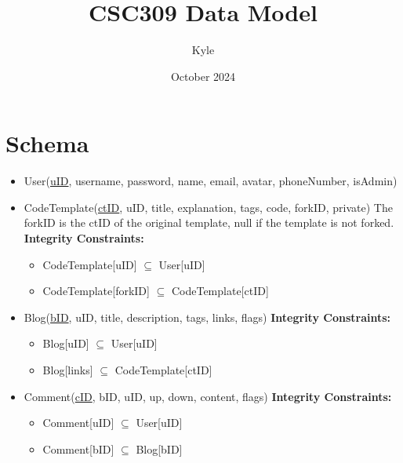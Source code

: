 \documentclass{article}
\title{CSC309 Data Model}
\author{Kyle}
\date{October 2024}
\begin{document}
\maketitle

\section*{Schema}

\begin{itemize}
\item
User(\underline{uID}, username, password, name, email, avatar, phoneNumber, isAdmin)

\item 
CodeTemplate(\underline{ctID}, uID, title, explanation, tags, code, forkID, private)
The forkID is the ctID of the original template, null if the template is not forked.
\textbf{Integrity Constraints:}
\begin{itemize}
\item CodeTemplate[uID] $\subseteq$ User[uID]
\item CodeTemplate[forkID] $\subseteq$ CodeTemplate[ctID]
\end{itemize}

\item 
Blog(\underline{bID}, uID, title, description, tags, links, flags)
\textbf{Integrity Constraints:}
\begin{itemize}
\item Blog[uID] $\subseteq$ User[uID]
\item Blog[links] $\subseteq$ CodeTemplate[ctID]
\end{itemize}

\item
Comment(\underline{cID}, bID, uID, up, down, content, flags)
\textbf{Integrity Constraints:}
\begin{itemize}
\item Comment[uID] $\subseteq$ User[uID]
\item Comment[bID] $\subseteq$ Blog[bID]
\end{itemize}




\end{itemize}
\end{document}
